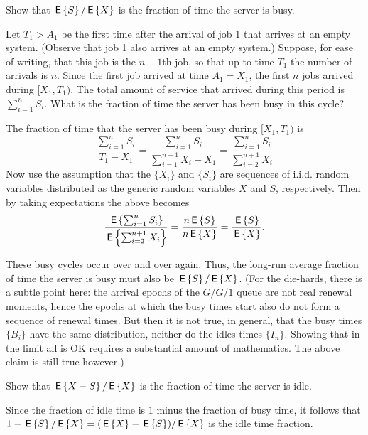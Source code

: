 \begin{exercise}
  Show that $\,\mathsf{E}\left\{S\right\}/\,\mathsf{E}\left\{X\right\}$ is the fraction of time the server is busy.
  \begin{hint}
Let $T_1>A_1$ be the first time after the arrival of job 1
    that arrives at an empty system. (Observe that job 1 also arrives
    at an empty system.)  Suppose, for ease of writing, that this job
    is the $n+1$th job, so that up to time $T_1$ the number of
    arrivals is $n$. Since the first job arrived at time $A_1=X_1$,
    the first $n$ jobs arrived during $[X_1, T_1)$. The total amount
    of service that arrived during this period is $\sum_{i=1}^n S_i$.
    What is the fraction of time the server has been busy in this
    cycle?
  \end{hint}
  \begin{solution}
 The
    fraction of time that the server has been busy during $[X_1, T_1)$
    is
        \begin{equation*}
\frac{\sum_{i=1}^n S_i}{T_1-X_1} 
=          \frac{\sum_{i=1}^n S_i}{\sum_{i=1}^{n+1}X_i -X_1} 
=          \frac{\sum_{i=1}^n S_i}{\sum_{i=2}^{n+1}X_i} 
        \end{equation*}
        Now use the assumption that the $\{X_i\}$ and $\{S_i\}$ are
        sequences of i.i.d. random variables distributed as the
        generic random variables $X$ and $S$, respectively. Then by
        taking expectations the above becomes
        \begin{equation*}
\frac{\,\mathsf{E}\left\{\sum_{i=1}^n S_i\right\}}{\,\mathsf{E}\left\{\sum_{i=2}^{n+1}X_i\right\}} 
= \frac{n \,\mathsf{E}\left\{S\right\} }{n \,\mathsf{E}\left\{X\right\}} =
 \frac{ \,\mathsf{E}\left\{S\right\} }{ \,\mathsf{E}\left\{X\right\}}.
        \end{equation*}

        These busy cycles occur over and over again. Thus, the
        long-run average fraction of time the server is busy must also
        be $\,\mathsf{E}\left\{S\right\}/\,\mathsf{E}\left\{X\right\}$. (For the die-hards, there is a subtle point
        here: the arrival epochs of the $G/G/1$ queue are not real
        renewal moments, hence the epochs at which the busy times
        start also do not form a sequence of renewal times. But then
        it is not true, in general, that the busy times $\{B_i\}$ have
        the same distribution, neither do the idles times
        $\{I_n\}$. Showing that in the limit all is OK requires a
        substantial amount of mathematics. The above claim is still
        true however.)
  \end{solution}
\end{exercise}

\begin{exercise}
 Show that $\,\mathsf{E}\left\{X - S\right\}/\,\mathsf{E}\left\{X\right\}$ is the fraction of time
  the server is idle.
  \begin{solution}
    Since the fraction of idle time is $1$ minus the fraction of busy
    time, it follows that $1-\,\mathsf{E}\left\{S\right\}/ \,\mathsf{E}\left\{X\right\} = (\,\mathsf{E}\left\{X\right\} - \,\mathsf{E}\left\{S\right\})/\,\mathsf{E}\left\{X\right\}$ is the
    idle time fraction.
  \end{solution}
\end{exercise}

